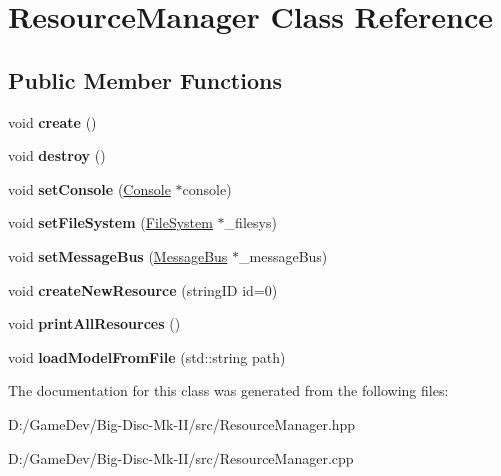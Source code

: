 \hypertarget{class_resource_manager}{}\section{Resource\+Manager Class Reference}
\label{class_resource_manager}
\subsection*{Public Member Functions}
\begin{DoxyCompactItemize}
\item 
\mbox{\label{class_resource_manager_a91109c3132c35c7189ff160cf00e45e7}} 
void {\bfseries create} ()
\item 
\mbox{\label{class_resource_manager_a1a7e1c5f097d977ebd90a685b293af35}} 
void {\bfseries destroy} ()
\item 
\mbox{\label{class_resource_manager_a56d83d9ef48904ffe40c98ba05cce00f}} 
void {\bfseries set\+Console} (\mbox{\hyperlink{class_console}{Console}} $\ast$console)
\item 
\mbox{\label{class_resource_manager_a6d31a35606b792744cea2ab9e5eefa58}} 
void {\bfseries set\+File\+System} (\mbox{\hyperlink{class_file_system}{File\+System}} $\ast$\+\_\+filesys)
\item 
\mbox{\label{class_resource_manager_aee3598cf1721028d14e14930ba7479c3}} 
void {\bfseries set\+Message\+Bus} (\mbox{\hyperlink{class_message_bus}{Message\+Bus}} $\ast$\+\_\+message\+Bus)
\item 
\mbox{\label{class_resource_manager_a525685e5780cad648d5f2d596799fe96}} 
void {\bfseries create\+New\+Resource} (string\+ID id=0)
\item 
\mbox{\label{class_resource_manager_a25acd07780375e85fda21ed2cdaff277}} 
void {\bfseries print\+All\+Resources} ()
\item 
\mbox{\label{class_resource_manager_a7970f4e7eac8dcba8e055a1dcd25a732}} 
void {\bfseries load\+Model\+From\+File} (std\+::string path)
\end{DoxyCompactItemize}


The documentation for this class was generated from the following files\+:\begin{DoxyCompactItemize}
\item 
D\+:/\+Game\+Dev/\+Big-\/\+Disc-\/\+Mk-\/\+I\+I/src/Resource\+Manager.\+hpp\item 
D\+:/\+Game\+Dev/\+Big-\/\+Disc-\/\+Mk-\/\+I\+I/src/Resource\+Manager.\+cpp\end{DoxyCompactItemize}
